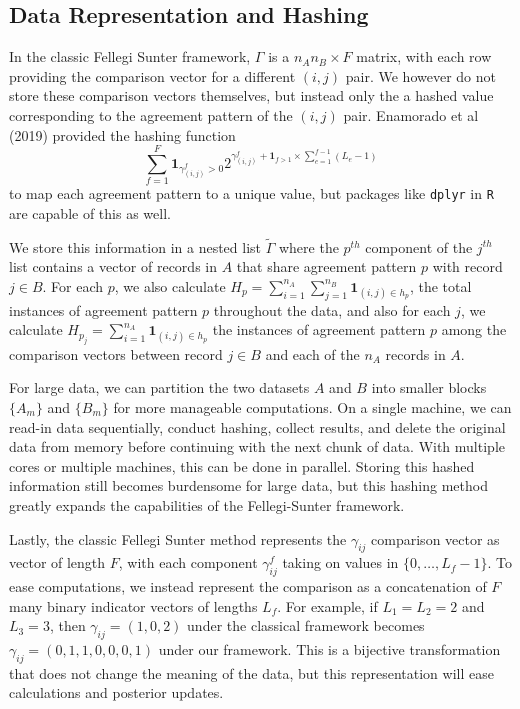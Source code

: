 \documentclass[
  12pt,
]{article}
\begin{document}
\hypertarget{data-representation-and-hashing}{%
\subsection{Data Representation and
Hashing}\label{data-representation-and-hashing}}

In the classic Fellegi Sunter framework, \(\Gamma\) is a
\(n_A n_B \times F\) matrix, with each row providing the comparison
vector for a different \((i,j)\) pair. We however do not store these
comparison vectors themselves, but instead only the a hashed value
corresponding to the agreement pattern of the \((i, j)\) pair. Enamorado
et al (2019) provided the hashing function
\[\sum_{f=1}^F \mathbf{1}_{\gamma_{(i,j)}^f >0}2^{\gamma_{(i,j)}^f + \mathbf{1}_{f>1} \times \sum_{e=1}^{f-1}(L_e-1)}\]
to map each agreement pattern to a unique value, but packages like
\texttt{dplyr} in \texttt{R} are capable of this as well.

We store this information in a nested list \(\tilde{\Gamma}\) where the
\(p^{th}\) component of the \(j^{th}\) list contains a vector of records
in \(A\) that share agreement pattern \(p\) with record \(j \in B\). For
each \(p\), we also calculate
\(H_p = \sum_{i=1}^{n_A}\sum_{j=1}^{n_B} \mathbf{1}_{(i,j) \in h_p}\),
the total instances of agreement pattern \(p\) throughout the data, and
also for each \(j\), we calculate
\(H_{p_j} = \sum_{i=1}^{n_A} \mathbf{1}_{{(i,j) \in h_p}}\) the
instances of agreement pattern \(p\) among the comparison vectors
between record \(j \in B\) and each of the \(n_A\) records in \(A\).

For large data, we can partition the two datasets \(A\) and \(B\) into
smaller blocks \(\{A_m\}\) and \(\{B_m\}\) for more manageable
computations. On a single machine, we can read-in data sequentially,
conduct hashing, collect results, and delete the original data from
memory before continuing with the next chunk of data. With multiple
cores or multiple machines, this can be done in parallel. Storing this
hashed information still becomes burdensome for large data, but this
hashing method greatly expands the capabilities of the Fellegi-Sunter
framework.

Lastly, the classic Fellegi Sunter method represents the \(\gamma_{ij}\)
comparison vector as vector of length \(F\), with each component
\(\gamma_{ij}^f\) taking on values in \(\{0, \ldots, L_f - 1\}\). To
ease computations, we instead represent the comparison as a
concatenation of \(F\) many binary indicator vectors of lengths \(L_f\).
For example, if \(L_1 = L_2 = 2\) and \(L_3 = 3\), then
\(\gamma_{ij} = (1, 0, 2)\) under the classical framework becomes
\(\gamma_{ij} = (0, 1, 1, 0, 0, 0, 1)\) under our framework. This is a
bijective transformation that does not change the meaning of the data,
but this representation will ease calculations and posterior updates.
\end{document}
